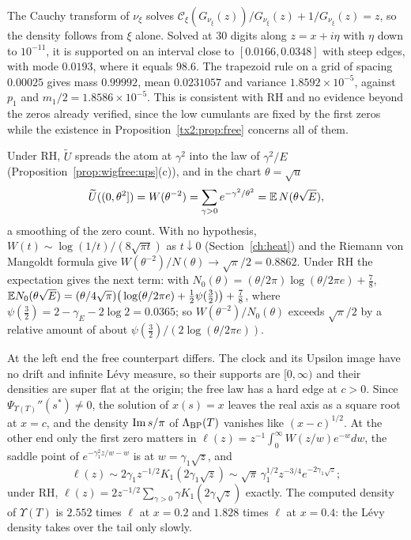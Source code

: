 The Cauchy transform of $\nu_\xi$ solves $\mathcal C_\xi(G_{\nu_\xi}(z))/G_{\nu_\xi}(z)+1/G_{\nu_\xi}(z)=z$, so the density follows from $\xi$ alone. Solved at $30$ digits along $z=x+i\eta$ with $\eta$ down to $10^{-11}$, it is supported on an interval close to $[0.0166,0.0348]$ with steep edges, with mode $0.0193$, where it equals $98.6$. The trapezoid rule on a grid of spacing $0.00025$ gives mass $0.99992$, mean $0.0231057$ and variance $1.8592\times10^{-5}$, against $p_1$ and $m_1/2=1.8586\times10^{-5}$. This is consistent with RH and no evidence beyond the zeros already verified, since the low cumulants are fixed by the first zeros while the existence in Proposition~\ref{tx2:prop:free} concerns all of them.

Under RH, $\widetilde U$ spreads the atom at $\gamma^2$ into the law of $\gamma^2/E$ (Proposition~\ref{prop:wigfree:ups}(c)), and in the chart $\theta=\sqrt u$
\[
\widetilde U((0,\theta^2])=W(\theta^{-2})=\sum_{\gamma>0}e^{-\gamma^2/\theta^2}=\mathbb{E}\,N(\theta\sqrt E),
\]
a smoothing of the zero count. With no hypothesis, $W(t)\sim\log(1/t)/(8\sqrt{\pi t})$ as $t\downarrow0$ (Section~\ref{ch:heat}) and the Riemann von Mangoldt formula give $W(\theta^{-2})/N(\theta)\to\sqrt\pi/2=0.8862$. Under RH the expectation gives the next term: with $N_0(\theta)=(\theta/2\pi)\log(\theta/2\pi e)+\frac78$, $\mathbb{E} N_0(\theta\sqrt E)=(\theta/4\sqrt\pi)\big(\log(\theta/2\pi e)+\frac12\psi(\frac32)\big)+\frac78$, where $\psi(\frac32)=2-\gamma_E-2\log2=0.0365$; so $W(\theta^{-2})/N_0(\theta)$ exceeds $\sqrt\pi/2$ by a relative amount of about $\psi(\frac32)/(2\log(\theta/2\pi e))$.

At the left end the free counterpart differs. The clock and its Upsilon image have no drift and infinite L\'evy measure, so their supports are $[0,\infty)$ \cite[Section 24]{Sato99} and their densities are super flat at the origin; the free law has a hard edge at $c>0$. Since $\Psi_{\Upsilon(T)}''(s^*)\ne0$, the solution of $x(s)=x$ leaves the real axis as a square root at $x=c$, and the density $\operatorname{Im} s/\pi$ of $\Lambda_{\rm BP}(T)$ vanishes like $(x-c)^{1/2}$. At the other end only the first zero matters in $\ell(z)=z^{-1}\int_0^\infty W(z/w)e^{-w}dw$, the saddle point of $e^{-\gamma_1^2z/w-w}$ is at $w=\gamma_1\sqrt z$, and
\[
\ell(z)\sim2\gamma_1z^{-1/2}K_1(2\gamma_1\sqrt z)\sim\sqrt\pi\,\gamma_1^{1/2}z^{-3/4}e^{-2\gamma_1\sqrt z};
\]
under RH, $\ell(z)=2z^{-1/2}\sum_{\gamma>0}\gamma K_1(2\gamma\sqrt z)$ exactly. The computed density of $\Upsilon(T)$ is $2.552$ times $\ell$ at $x=0.2$ and $1.828$ times $\ell$ at $x=0.4$: the L\'evy density takes over the tail only slowly.


